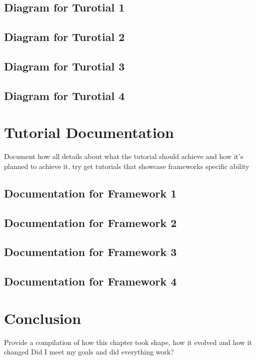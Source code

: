 \subsection{Diagram for Turotial 1}
\subsection{Diagram for Turotial 2}
\subsection{Diagram for Turotial 3}
\subsection{Diagram for Turotial 4}

\section{Tutorial Documentation}
Document how all details about what the tutorial should achieve and how
it's planned to achieve it. try get tutorials that showcase frameworks specific ability
\subsection{Documentation for Framework 1}
\subsection{Documentation for Framework 2}
\subsection{Documentation for Framework 3}
\subsection{Documentation for Framework 4}

\section{Conclusion}
Provide a compilation of how this chapter took shape, how it evolved and how it changed
Did I meet my goals and did everything work?
